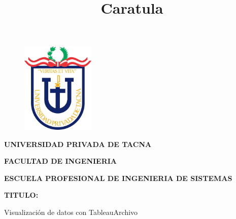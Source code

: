 \documentclass[12pt,letterpaper]{article}
\begin{document}
%

  
\title{Caratula}

\begin{titlepage}
    \begin{center}
    \begin{figure}[htb]
    \begin{center}
    \includegraphics[width=3.5cm]{./img/upt.jpg}
    \end{center}
    \end{figure}
    
    \vspace*{0.15in}
    \begin{Large}
    \textbf{UNIVERSIDAD PRIVADA DE TACNA}\\
    \end{Large}
    
    \vspace*{0.1in}
    \begin{Large}
    \textbf{FACULTAD DE INGENIERIA} \\
    \end{Large}
    
    \vspace*{0.1in}
    \begin{Large}
    \textbf{ESCUELA PROFESIONAL DE INGENIERIA DE SISTEMAS} \\
    \end{Large}
    
    \vspace*{0.5in}
    \begin{Large}
    \textbf{TITULO:}\\
    \end{Large}
    

\vspace*{0.1in}
\begin{Large}
    Visualización de datos con TableauArchivo \\
\end{Large}


\end{center}
\end{titlepage}
\end{document}
